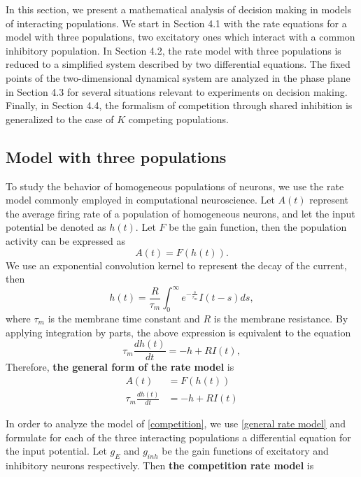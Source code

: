\documentclass[12pt,hyperref,a4paper,UTF8]{ctexart}
\begin{document}
In this section, we present a mathematical analysis of decision making in models of interacting populations. We start in Section 4.1 with the rate equations for a model with three populations, two excitatory ones which interact with a common inhibitory population. In Section 4.2, the rate model with three populations is reduced to a simplified system described by two differential equations. The fixed points of the two-dimensional dynamical system are analyzed in the phase plane in Section 4.3 for several situations relevant to experiments on decision making. Finally, in Section 4.4, the formalism of competition through shared inhibition is generalized to the case of $K$ competing populations.

\subsection{Model with three populations}

To study the behavior of homogeneous populations of neurons, we use the rate model commonly employed in computational neuroscience. Let $A(t)$ represent the average firing rate of a population of homogeneous neurons, and let the input potential be denoted as $h(t)$. Let $F$ be the gain function, then the population activity can be expressed as
$$A(t)=F(h(t)).$$
We use an exponential convolution kernel to represent the decay of the current, then
$$h(t)=\frac{R}{\tau_m}\int_{0}^{\infty}e^{-\frac{s}{\tau_m}}I(t-s)ds,$$
where $\tau_m$ is the membrane time constant and $R$ is the membrane resistance. By applying integration by parts, the above expression is equivalent to the equation
$$\tau_m\frac{dh(t)}{dt}=-h+RI(t),$$
Therefore, \textbf{the general form of the rate model} is
\begin{equation}
    \begin{aligned}
        A(t)&=F(h(t))\\
        \tau_m\frac{dh(t)}{dt}&=-h+RI(t)
    \end{aligned}
\end{equation}\label{general rate model}

In order to analyze the model of \autoref{competition}, we use \autoref{general rate model} and formulate for each of the three interacting populations a differential equation for the input potential. Let $g_E$ and $g_{inh}$ be the gain functions of excitatory and inhibitory neurons respectively. Then \textbf{the competition rate model} is
\end{document}
